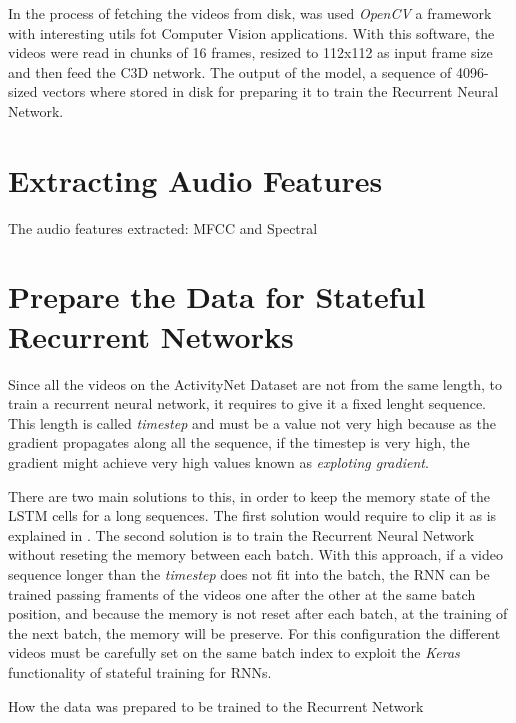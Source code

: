 In the process of fetching the videos from disk, was used \textit{OpenCV}\cite{opencv_library} a framework with interesting utils fot Computer Vision applications. With this software, the videos were read in chunks of 16 frames, resized to 112x112 as input frame size and then feed the C3D network. The output of the model, a sequence of 4096-sized vectors where stored in disk for preparing it to train the Recurrent Neural Network.

\section{Extracting Audio Features}

The audio features extracted: MFCC and Spectral


\section{Prepare the Data for Stateful Recurrent Networks}

Since all the videos on the ActivityNet Dataset are not from the same length, to train a recurrent neural network, it requires to give it a fixed lenght sequence. This length is called \textit{timestep} and must be a value not very high because as the gradient propagates along all the sequence, if the timestep is very high, the gradient might achieve very high values known as \textit{exploting gradient}.

There are two main solutions to this, in order to keep the memory state of the LSTM cells for a long sequences. The first solution would require to clip it as is explained in \cite{pascanu2012difficulty}. The second solution is to train the Recurrent Neural Network without reseting the memory between each batch. With this approach, if a video sequence longer than the \textit{timestep} does not fit into the batch, the RNN can be trained passing framents of the videos one after the other at the same batch position, and because the memory is not reset after each batch, at the training of the next batch, the memory will be preserve. For this configuration the different videos must be carefully set on the same batch index to exploit the \textit{Keras} functionality of stateful training for RNNs.





How the data was prepared to be trained to the Recurrent Network

